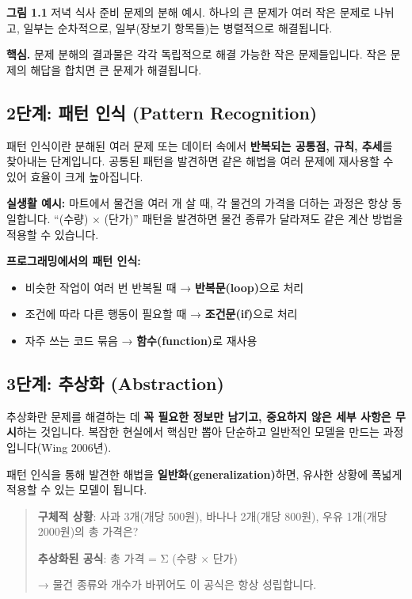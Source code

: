 \documentclass[
  korean,
  11pt,
  a4paper,
  DIV=11,
  numbers=noendperiod]{scrreprt}
\providecommand{\tightlist}{%
  \setlength{\itemsep}{0pt}\setlength{\parskip}{0pt}}
\begin{document}
\textbf{그림 1.1} 저녁 식사 준비 문제의 분해 예시. 하나의 큰 문제가 여러
작은 문제로 나뉘고, 일부는 순차적으로, 일부(장보기 항목들)는 병렬적으로
해결됩니다.

\textbf{핵심.} 문제 분해의 결과물은 각각 독립적으로 해결 가능한 작은
문제들입니다. 작은 문제의 해답을 합치면 큰 문제가 해결됩니다.

\subsection{2단계: 패턴 인식 (Pattern
Recognition)}\label{uxb2e8uxacc4-uxd328uxd134-uxc778uxc2dd-pattern-recognition}

{패턴 인식}이란 분해된 여러 문제 또는 데이터 속에서 \textbf{반복되는
공통점, 규칙, 추세}를 찾아내는 단계입니다. 공통된 패턴을 발견하면 같은
해법을 여러 문제에 재사용할 수 있어 효율이 크게 높아집니다.

\textbf{실생활 예시:} 마트에서 물건을 여러 개 살 때, 각 물건의 가격을
더하는 과정은 항상 동일합니다. ``(수량) × (단가)'' 패턴을 발견하면 물건
종류가 달라져도 같은 계산 방법을 적용할 수 있습니다.

\textbf{프로그래밍에서의 패턴 인식:}

\begin{itemize}
\tightlist
\item
  비슷한 작업이 여러 번 반복될 때 → \textbf{반복문(loop)}으로 처리
\item
  조건에 따라 다른 행동이 필요할 때 → \textbf{조건문(if)}으로 처리
\item
  자주 쓰는 코드 묶음 → \textbf{함수(function)}로 재사용
\end{itemize}

\subsection{3단계: 추상화
(Abstraction)}\label{uxb2e8uxacc4-uxcd94uxc0c1uxd654-abstraction}

{추상화}란 문제를 해결하는 데 \textbf{꼭 필요한 정보만 남기고, 중요하지
않은 세부 사항은 무시}하는 것입니다. 복잡한 현실에서 핵심만 뽑아
단순하고 일반적인 모델을 만드는 과정입니다(Wing 2006년).

패턴 인식을 통해 발견한 해법을 \textbf{일반화(generalization)}하면,
유사한 상황에 폭넓게 적용할 수 있는 모델이 됩니다.

\begin{quote}
\textbf{구체적 상황}: 사과 3개(개당 500원), 바나나 2개(개당 800원), 우유
1개(개당 2000원)의 총 가격은?

\textbf{추상화된 공식}: 총 가격 = Σ (수량 × 단가)

→ 물건 종류와 개수가 바뀌어도 이 공식은 항상 성립합니다.
\end{quote}
\end{document}
